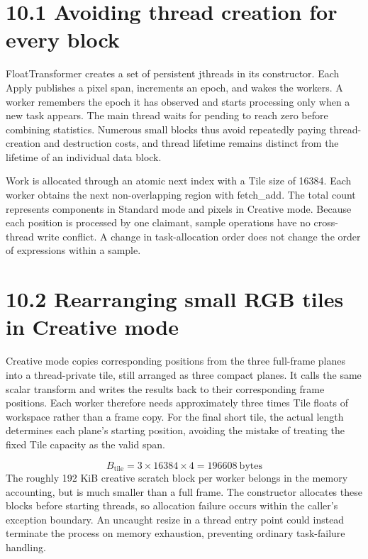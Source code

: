 \documentclass[11pt,a4paper,openany]{book}
\begin{document}
\section*{10.1 Avoiding thread creation for every block}
FloatTransformer creates a set of persistent jthreads in its constructor. Each Apply publishes a pixel span, increments an epoch, and wakes the workers. A worker remembers the epoch it has observed and starts processing only when a new task appears. The main thread waits for pending to reach zero before combining statistics. Numerous small blocks thus avoid repeatedly paying thread-creation and destruction costs, and thread lifetime remains distinct from the lifetime of an individual data block.

Work is allocated through an atomic next index with a Tile size of 16384. Each worker obtains the next non-overlapping region with fetch\_add. The total count represents components in Standard mode and pixels in Creative mode. Because each position is processed by one claimant, sample operations have no cross-thread write conflict. A change in task-allocation order does not change the order of expressions within a sample.


\section*{10.2 Rearranging small RGB tiles in Creative mode}
Creative mode copies corresponding positions from the three full-frame planes into a thread-private tile, still arranged as three compact planes. It calls the same scalar transform and writes the results back to their corresponding frame positions. Each worker therefore needs approximately three times Tile floats of workspace rather than a frame copy. For the final short tile, the actual length determines each plane's starting position, avoiding the mistake of treating the fixed Tile capacity as the valid span.


\begin{equation}
B_{\mathrm{tile}}=3\times16384\times4=196608\ \mathrm{bytes}
\end{equation}
The roughly 192 KiB creative scratch block per worker belongs in the memory accounting, but is much smaller than a full frame. The constructor allocates these blocks before starting threads, so allocation failure occurs within the caller's exception boundary. An uncaught resize in a thread entry point could instead terminate the process on memory exhaustion, preventing ordinary task-failure handling.
\end{document}
